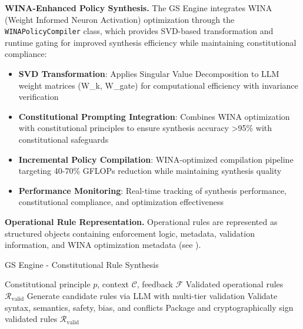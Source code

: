 \documentclass[manuscript,screen,review,anonymous,9pt]{acmart}
\begin{document}
\textbf{WINA-Enhanced Policy Synthesis.} The GS Engine integrates WINA (Weight Informed Neuron Activation) optimization \cite{WINA2024NeuronActivation} through the \texttt{WINAPolicyCompiler} class, which provides SVD-based transformation and runtime gating for improved synthesis efficiency while maintaining constitutional compliance:

\begin{itemize}
    \item \textbf{SVD Transformation}: Applies Singular Value Decomposition to LLM weight matrices (W\_k, W\_gate) for computational efficiency with invariance verification \cite{SVDOptimization2024}
    \item \textbf{Constitutional Prompting Integration}: Combines WINA optimization with constitutional principles to ensure synthesis accuracy >95\% with constitutional safeguards \cite{ConstitutionalCompliance2024}
    \item \textbf{Incremental Policy Compilation}: WINA-optimized compilation pipeline targeting 40-70\% GFLOPs reduction while maintaining synthesis quality
    \item \textbf{Performance Monitoring}: Real-time tracking of synthesis performance, constitutional compliance, and optimization effectiveness \cite{PerformanceMonitoring2024}
\end{itemize}

\textbf{Operational Rule Representation.} Operational rules are represented as structured objects containing enforcement logic, metadata, validation information, and WINA optimization metadata (see ).

\begin{algorithm}[!htbp]
\caption{GS Engine - Constitutional Rule Synthesis}
\label{alg:gs_engine}
\begin{algorithmic}[1]
\Require Constitutional principle $p$, context $\mathcal{C}$, feedback $\mathcal{F}$
\Ensure Validated operational rules $\mathcal{R}_{\text{valid}}$
  \State Generate candidate rules via LLM with multi-tier validation
  \State Validate syntax, semantics, safety, bias, and conflicts
  \State Package and cryptographically sign validated rules
  \State \Return $\mathcal{R}_{\text{valid}}$
\EndFunction
\end{algorithmic}
\end{algorithm}
\end{document}
